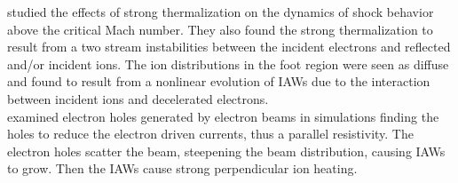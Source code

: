 \documentclass[grl]{AGUTeX}
\begin{document}
\begin{article}
\citet{shimada05} studied the effects of strong thermalization on the dynamics of shock behavior above the critical Mach number.  They also found the strong thermalization to result from a two stream instabilities between the incident electrons and reflected and/or incident ions.  The ion distributions in the foot region were seen as diffuse and found to result from a nonlinear evolution of IAWs due to the interaction between incident ions and decelerated electrons.  \\ %
\indent  \citet{dyrud06} examined electron holes generated by electron beams in simulations finding the holes to reduce the electron driven currents, thus a parallel resistivity.  The electron holes scatter the beam, steepening the beam distribution, causing IAWs to grow.  Then the IAWs cause strong perpendicular ion heating.  \\
\\

\end{article}
\end{document}

